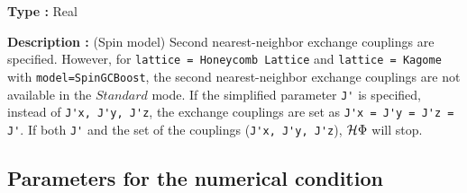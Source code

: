 \begin{itemize}
{\bf Type :} Real

{\bf Description :} (Spin model)
Second nearest-neighbor exchange couplings are specified.
However, for \verb|lattice = Honeycomb Lattice| and  \verb|lattice = Kagome|
with \verb|model=SpinGCBoost|,
the second nearest-neighbor exchange couplings are not available in the $Standard$ mode.
If the simplified parameter \verb|J'| is specified, instead of
\verb|J'x, J'y, J'z|,
the exchange couplings are set as
\verb|J'x = J'y = J'z = J'|.
If both \verb|J'| and the set of the couplings (\verb|J'x, J'y, J'z|),
$\mathcal{H} \Phi$ will stop.
\end{itemize}

\subsection{Parameters for the numerical condition}

